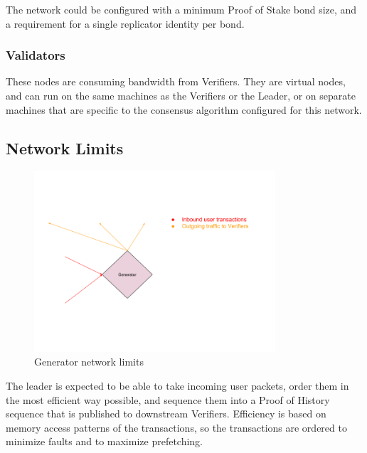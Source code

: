 \documentclass[12pt]{article}
\begin{document}
The network could be configured with a minimum Proof of Stake bond size, and a requirement for a single replicator identity per bond.
\subsubsection{Validators}
These nodes are consuming bandwidth from Verifiers. They are virtual nodes, and can run on the same machines as the Verifiers or the Leader, or on separate machines that are specific to the consensus algorithm configured for this network.

\subsection{Network Limits}

\begin{figure}
  \begin{center}
    \centering
    \includegraphics[width=0.8\textwidth]{figures/fig_10.png}
    \caption[Fig 10]{Generator network limits\label{fig_10}}
  \end{center}
  \end{figure}

The leader is expected to be able to take incoming user packets, order them in the most efficient way possible, and sequence them into a Proof of History sequence that is published to downstream Verifiers. Efficiency is based on memory access patterns of the transactions, so the transactions are ordered to minimize faults and to maximize prefetching.\\\\
\end{document}
